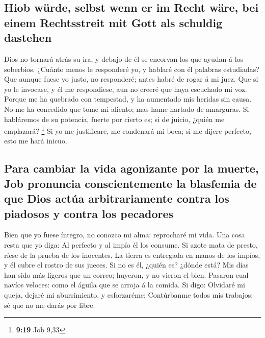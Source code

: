 \hypertarget{hiob-wuxfcrde-selbst-wenn-er-im-recht-wuxe4re-bei-einem-rechtsstreit-mit-gott-als-schuldig-dastehen}{%
\subsection{Hiob würde, selbst wenn er im Recht wäre, bei einem
Rechtsstreit mit Gott als schuldig
dastehen}\label{hiob-wuxfcrde-selbst-wenn-er-im-recht-wuxe4re-bei-einem-rechtsstreit-mit-gott-als-schuldig-dastehen}}

 Dios no tornará atrás su ira, y debajo de él se encorvan
los que ayudan á los soberbios.  ¿Cuánto menos le
responderé yo, y hablaré con él palabras estudiadas?  Que
aunque fuese yo justo, no responderé; antes habré de rogar á mi juez.
 Que si yo le invocase, y él me respondiese, aun no creeré
que haya escuchado mi voz.  Porque me ha quebrado con
tempestad, y ha aumentado mis heridas sin causa.  No me ha
concedido que tome mi aliento; mas hame hartado de amarguras.
 Si habláremos de su potencia, fuerte por cierto es; si de
juicio, ¿quién me emplazará? \footnote{\textbf{9:19} Job 9,33}
 Si yo me justificare, me condenará mi boca; si me dijere
perfecto, esto me hará inicuo.

\hypertarget{para-cambiar-la-vida-agonizante-por-la-muerte-job-pronuncia-conscientemente-la-blasfemia-de-que-dios-actuxfaa-arbitrariamente-contra-los-piadosos-y-contra-los-pecadores}{%
\subsection{Para cambiar la vida agonizante por la muerte, Job pronuncia
conscientemente la blasfemia de que Dios actúa arbitrariamente contra
los piadosos y contra los
pecadores}\label{para-cambiar-la-vida-agonizante-por-la-muerte-job-pronuncia-conscientemente-la-blasfemia-de-que-dios-actuxfaa-arbitrariamente-contra-los-piadosos-y-contra-los-pecadores}}

 Bien que yo fuese íntegro, no conozco mi alma: reprocharé
mi vida.  Una cosa resta que yo diga: Al perfecto y al
impío él los consume.  Si azote mata de presto, ríese de la
prueba de los inocentes.  La tierra es entregada en manos
de los impíos, y él cubre el rostro de sus jueces. Si no es él, ¿quién
es? ¿dónde está?  Mis días han sido más ligeros que un
correo; huyeron, y no vieron el bien.  Pasaron cual navíos
veloces: como el águila que se arroja á la comida.  Si
digo: Olvidaré mi queja, dejaré mi aburrimiento, y esforzaréme:
 Contúrbanme todos mis trabajos; sé que no me darás por
libre.

